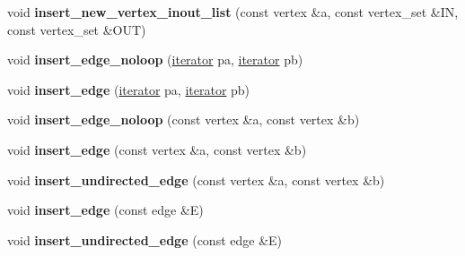 \begin{DoxyCompactItemize}
\mbox{\label{class_n_graph_1_1t_graph_a5fb33cf26902838865ac86fc51123a96}} 
void {\bfseries insert\+\_\+new\+\_\+vertex\+\_\+inout\+\_\+list} (const vertex \&a, const vertex\+\_\+set \&IN, const vertex\+\_\+set \&O\+UT)
\item 
\mbox{\label{class_n_graph_1_1t_graph_a3227d649839908a87afbd80316cc493f}} 
void {\bfseries insert\+\_\+edge\+\_\+noloop} (\mbox{\hyperlink{class_n_graph_1_1t_graph_a6e446a33b74e5c0c39fb6c50a4f07cec}{iterator}} pa, \mbox{\hyperlink{class_n_graph_1_1t_graph_a6e446a33b74e5c0c39fb6c50a4f07cec}{iterator}} pb)
\item 
\mbox{\label{class_n_graph_1_1t_graph_a5ee540bb69a2bdd199b63af489439545}} 
void {\bfseries insert\+\_\+edge} (\mbox{\hyperlink{class_n_graph_1_1t_graph_a6e446a33b74e5c0c39fb6c50a4f07cec}{iterator}} pa, \mbox{\hyperlink{class_n_graph_1_1t_graph_a6e446a33b74e5c0c39fb6c50a4f07cec}{iterator}} pb)
\item 
\mbox{\label{class_n_graph_1_1t_graph_ad8ef6d934af47685338257274e421bab}} 
void {\bfseries insert\+\_\+edge\+\_\+noloop} (const vertex \&a, const vertex \&b)
\item 
\mbox{\label{class_n_graph_1_1t_graph_a7e62b364e0a03fb416facee8b51d99da}} 
void {\bfseries insert\+\_\+edge} (const vertex \&a, const vertex \&b)
\item 
\mbox{\label{class_n_graph_1_1t_graph_a6a0b8b06f321534275d982ae500a4df3}} 
void {\bfseries insert\+\_\+undirected\+\_\+edge} (const vertex \&a, const vertex \&b)
\item 
\mbox{\label{class_n_graph_1_1t_graph_a7aa85e0fe919a7c6fafac8051271421b}} 
void {\bfseries insert\+\_\+edge} (const edge \&E)
\item 
\mbox{\label{class_n_graph_1_1t_graph_a90d80d85d509b09c932fde138fb0aae0}} 
void {\bfseries insert\+\_\+undirected\+\_\+edge} (const edge \&E)
\item 
\mbox{\label{class_n_graph_1_1t_graph_a5af6f7dbadd1f355987bca99d210ebdb}} 

\end{DoxyCompactItemize}
